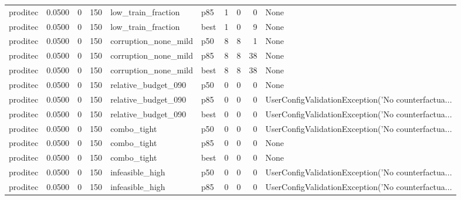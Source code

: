 \begin{tabular}{lrrrllrrrl}
proditec &    0.0500 &    0 &    150 &   low\_train\_fraction &    p85 &               1 &          0 &       0 &                                               None \\
proditec &    0.0500 &    0 &    150 &   low\_train\_fraction &   best &               1 &          0 &       9 &                                               None \\
proditec &    0.0500 &    0 &    150 & corruption\_none\_mild &    p50 &               8 &          8 &       1 &                                               None \\
proditec &    0.0500 &    0 &    150 & corruption\_none\_mild &    p85 &               8 &          8 &      38 &                                               None \\
proditec &    0.0500 &    0 &    150 & corruption\_none\_mild &   best &               8 &          8 &      38 &                                               None \\
proditec &    0.0500 &    0 &    150 &  relative\_budget\_090 &    p50 &               0 &          0 &       0 &                                               None \\
proditec &    0.0500 &    0 &    150 &  relative\_budget\_090 &    p85 &               0 &          0 &       0 & UserConfigValidationException('No counterfactua... \\
proditec &    0.0500 &    0 &    150 &  relative\_budget\_090 &   best &               0 &          0 &       0 & UserConfigValidationException('No counterfactua... \\
proditec &    0.0500 &    0 &    150 &          combo\_tight &    p50 &               0 &          0 &       0 & UserConfigValidationException('No counterfactua... \\
proditec &    0.0500 &    0 &    150 &          combo\_tight &    p85 &               0 &          0 &       0 &                                               None \\
proditec &    0.0500 &    0 &    150 &          combo\_tight &   best &               0 &          0 &       0 &                                               None \\
proditec &    0.0500 &    0 &    150 &      infeasible\_high &    p50 &               0 &          0 &       0 & UserConfigValidationException('No counterfactua... \\
proditec &    0.0500 &    0 &    150 &      infeasible\_high &    p85 &               0 &          0 &       0 & UserConfigValidationException('No counterfactua... \\

\end{tabular}
